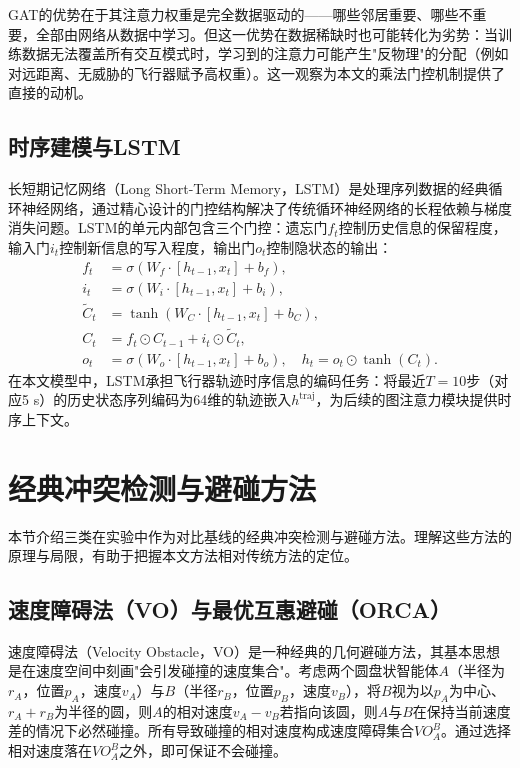 \documentclass[12pt,a4paper,UTF8]{ctexbook}
\begin{document}
GAT的优势在于其注意力权重是完全数据驱动的——哪些邻居重要、哪些不重要，全部由网络从数据中学习。但这一优势在数据稀缺时也可能转化为劣势：当训练数据无法覆盖所有交互模式时，学习到的注意力可能产生"反物理"的分配（例如对远距离、无威胁的飞行器赋予高权重）。这一观察为本文的乘法门控机制提供了直接的动机。

\subsection{时序建模与LSTM}

长短期记忆网络（Long Short-Term Memory，LSTM）\cite{ref37}是处理序列数据的经典循环神经网络，通过精心设计的门控结构解决了传统循环神经网络的长程依赖与梯度消失问题。LSTM的单元内部包含三个门控：遗忘门$f_t$控制历史信息的保留程度，输入门$i_t$控制新信息的写入程度，输出门$o_t$控制隐状态的输出：
\begin{align}
    f_t &= \sigma(W_f\cdot[h_{t-1},x_t]+b_f),\\
    i_t &= \sigma(W_i\cdot[h_{t-1},x_t]+b_i),\\
    \tilde{C}_t &= \tanh(W_C\cdot[h_{t-1},x_t]+b_C),\\
    C_t &= f_t\odot C_{t-1} + i_t\odot\tilde{C}_t,\\
    o_t &= \sigma(W_o\cdot[h_{t-1},x_t]+b_o),\quad h_t = o_t\odot\tanh(C_t).
\end{align}
在本文模型中，LSTM承担飞行器轨迹时序信息的编码任务：将最近$T=10$步（对应5 s）的历史状态序列编码为64维的轨迹嵌入$h^{\text{traj}}$，为后续的图注意力模块提供时序上下文。

\section{经典冲突检测与避碰方法}

本节介绍三类在实验中作为对比基线的经典冲突检测与避碰方法。理解这些方法的原理与局限，有助于把握本文方法相对传统方法的定位。

\subsection{速度障碍法（VO）与最优互惠避碰（ORCA）}

速度障碍法（Velocity Obstacle，VO）是一种经典的几何避碰方法，其基本思想是在速度空间中刻画"会引发碰撞的速度集合"。考虑两个圆盘状智能体$A$（半径为$r_A$，位置$p_A$，速度$v_A$）与$B$（半径$r_B$，位置$p_B$，速度$v_B$），将$B$视为以$p_A$为中心、$r_A+r_B$为半径的圆，则$A$的相对速度$v_A-v_B$若指向该圆，则$A$与$B$在保持当前速度差的情况下必然碰撞。所有导致碰撞的相对速度构成速度障碍集合$VO^B_A$。通过选择相对速度落在$VO^B_A$之外，即可保证不会碰撞。
\end{document}
